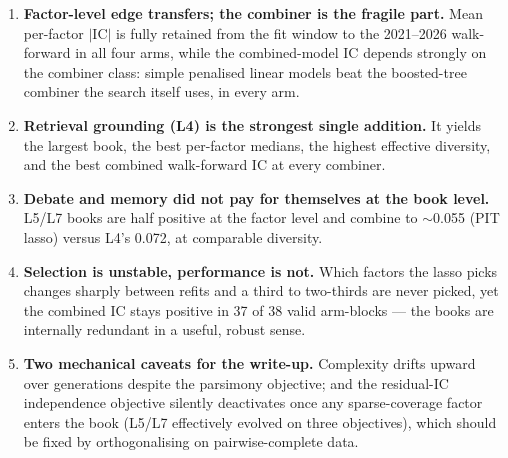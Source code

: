 \documentclass[11pt,a4paper]{article}
\begin{document}
\begin{enumerate}
\item \textbf{Factor-level edge transfers; the combiner is the fragile part.}
Mean per-factor $|$IC$|$ is fully retained from the fit window to the 2021--2026
walk-forward in all four arms, while the combined-model IC depends strongly on
the combiner class: simple penalised linear models beat the boosted-tree
combiner the search itself uses, in every arm.
\item \textbf{Retrieval grounding (L4) is the strongest single addition.} It
yields the largest book, the best per-factor medians, the highest effective
diversity, and the best combined walk-forward IC at every combiner.
\item \textbf{Debate and memory did not pay for themselves at the book level.}
L5/L7 books are half positive at the factor level and combine to $\sim$0.055
(PIT lasso) versus L4's 0.072, at comparable diversity.
\item \textbf{Selection is unstable, performance is not.} Which factors the
lasso picks changes sharply between refits and a third to two-thirds are never
picked, yet the combined IC stays positive in 37 of 38 valid arm-blocks --- the
books are internally redundant in a useful, robust sense.
\item \textbf{Two mechanical caveats for the write-up.} Complexity drifts
upward over generations despite the parsimony objective; and the residual-IC
independence objective silently deactivates once any sparse-coverage factor
enters the book (L5/L7 effectively evolved on three objectives), which should
be fixed by orthogonalising on pairwise-complete data.
\end{enumerate}
\end{document}
